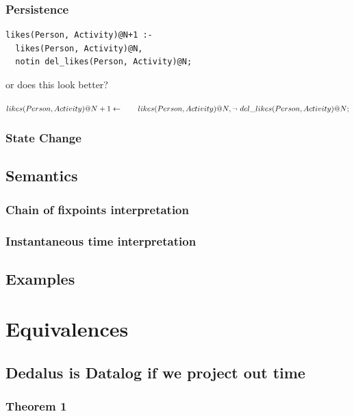 \documentclass{acm_proc_article-sp-sigmod09}
\begin{document}
\subsubsection{Persistence}

\begin{verbatim}
likes(Person, Activity)@N+1 :-
  likes(Person, Activity)@N,
  notin del_likes(Person, Activity)@N;
\end{verbatim}

or does this look better?

$
likes(Person, Activity)@N+1 \leftarrow \\
  \quad \quad likes(Person, Activity)@N, \\
  \lnot~del\_likes(Person, Activity)@N;
$

\subsubsection{State Change}


\subsection{Semantics}
\subsubsection{Chain of fixpoints interpretation}
\subsubsection{Instantaneous time interpretation}

\subsection{Examples}

\section{Equivalences}

\subsection{Dedalus is Datalog if we project out time}

\subsubsection{Theorem 1}
\end{document}
